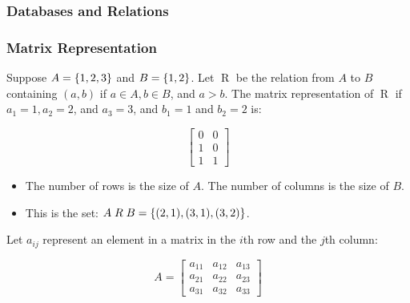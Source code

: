 \documentclass[article, 12pt]{article}
\theoremstyle{definition}
\DeclarePairedDelimiter\set{\{}{\}}
\begin{document}
    \subsubsection{Databases and Relations}
    
    \subsubsection{Matrix Representation}
    Suppose $A = \set*{1,2,3}$ and $B = \set*{1,2}$. Let $\mathrel{R}$ be the relation from $A$ to $B$ containing $(a,b)$ if $a \in A, b \in B$, and $a > b$. The matrix representation of $\mathrel{R}$ if $a_1 = 1, a_2 = 2$, and $a_3 = 3$, and $b_1 = 1$ and $b_2 = 2$ is:
    \begin{figure}[H]
        \[ \begin{bmatrix}
            0 & 0 \\
            1 & 0 \\
            1 & 1
        \end{bmatrix} \] 
    \end{figure}
    \begin{itemize}
        \item The number of rows is the size of $A$. The number of columns is the size of $B$. 
        \item This is the set: $A \mathrel{R} B = \set*{(2,1), (3,1), (3,2)}$.
    \end{itemize}
    Let $a_{ij}$ represent an element in a matrix in the $i$th row and the $j$th column:
    \begin{figure}[H]
        \[ A = \begin{bmatrix}
            a_{11} & a_{12} & a_{13} \\
            a_{21} & a_{22} & a_{23} \\
            a_{31} & a_{32} & a_{33}
        \end{bmatrix} \]
    \end{figure}
\end{document}
